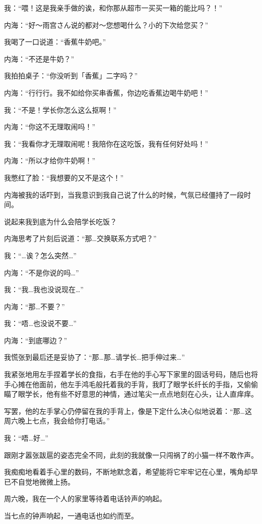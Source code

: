 我：“喂！这是我亲手做的诶，和你那从超市一买买一箱的能比吗？！”

内海：“好～雨宫さん说的都对～您想喝什么？小的下次给您买？”

我喝了一口说道：“香蕉牛奶吧。”

内海：“不还是牛奶？”

我拍拍桌子：“你没听到「香蕉」二字吗？”

内海：“行行行。我不如给你买串香蕉，你边吃香蕉边喝牛奶吧！”

我：“不是！学长你怎么这么抠啊！”

内海：“你这不无理取闹吗！”

我：“我看你才无理取闹呢！我陪你在这吃饭，我有任何好处吗！”

内海：“所以才给你牛奶啊！”

我憋红了脸：“我想要的又不是这个！”

内海被我的话吓到，当我意识到我自己说了什么的时候，气氛已经僵持了一段时间。

说起来我到底为什么会陪学长吃饭？

内海思考了片刻后说道：“那…交换联系方式吧？”

我：“…诶？怎么突然…”

内海：“不是你说的吗…”

我：“我…我也没说现在…”

内海：“那…不要？”

我：“唔…也没说不要…”

内海：“到底哪边？”

我慌张到最后还是妥协了：“那…那…请学长…把手伸过来…”

我紧张地用左手捏着学长的食指，右手在他的手心写下家里的固话号码，随后也将手心摊在他面前，他左手鸿毛般托着我的手背，我盯了眼学长纤长的手指，又偷偷瞄了眼学长，他有些不好意思的神情，通过笔尖一点点地刻在心头，让人直痒痒。

写罢，他的左手掌心仍停留在我的手背上，像是下定什么决心似地说着：“那…这周六晚上七点，我会给你打电话。”

我：“唔…好…”

跟刚才嚣张跋扈的姿态完全不同，此刻的我就像一只闯祸了的小猫一样不敢作声。

我痴痴地看着手心里的数码，不断地默念着，希望能将它牢牢记在心里，嘴角却早已不自觉地微微上扬。


\newday{{\harfmoonr\night}}

周六晚，我在一个人的家里等待着电话铃声的响起。

当七点的钟声响起，一通电话也如约而至。

